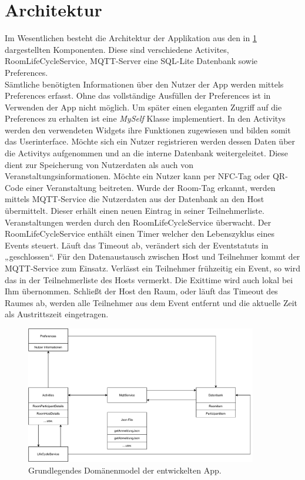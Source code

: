 \section{Architektur}
\label{sec:Architektur}
Im Wesentlichen besteht die Architektur der Applikation aus den in \cref{img:dmodel} dargestellten Komponenten. 
Diese sind verschiedene Activites, RoomLifeCycleService, MQTT-Server eine SQL-Lite Datenbank sowie Preferences.\\
Sämtliche benötigten Informationen über den Nutzer der App werden mittels Preferences erfasst. 
Ohne das vollständige Ausfüllen der Preferences ist in Verwenden der App nicht möglich. 
Um später einen eleganten Zugriff auf die Preferences zu erhalten ist eine \textit{MySelf} Klasse implementiert. 
In den Activitys werden den  verwendeten Widgets ihre Funktionen zugewiesen und bilden somit das Userinterface.
 Möchte sich ein Nutzer registrieren werden dessen Daten über die Activitys aufgenommen und an die interne Datenbank weitergeleitet. 
Diese dient zur Speicherung von Nutzerdaten als auch von Veranstaltungsinformationen. 
Möchte ein Nutzer kann per NFC-Tag oder QR-Code einer Veranstaltung beitreten.
Wurde der Room-Tag 
 erkannt, werden mittels MQTT-Service die Nutzerdaten aus der Datenbank  an den Host übermittelt.
 Dieser erhält einen neuen Eintrag in seiner Teilnehmerliste.
Veranstaltungen werden durch den RoomLifeCycleService überwacht. Der RoomLifeCycleService enthält einen Timer welcher den Lebenszyklus eines Events steuert. 
Läuft das Timeout ab, verändert sich der Eventstatuts in „geschlossen“. 
Für den Datenaustausch zwischen Host und Teilnehmer kommt der MQTT-Service zum Einsatz. 
Verlässt ein Teilnehmer frühzeitig ein Event, so wird das in der Teilnehmerliste des Hosts vermerkt. Die Exittime wird auch lokal bei Ihm übernommen. 
Schließt der Host den Raum, oder läuft das Timeout des Raumes ab, werden alle Teilnehmer aus dem Event entfernt und die aktuelle Zeit als Austrittszeit eingetragen. 
\begin{figure}
	\centering
	\includegraphics[width =0.9\textwidth]{images/DomaenenModel.pdf}
	\caption{Grundlegendes Domänenmodel der entwickelten App.}
	\label{img:dmodel}
\end{figure}
